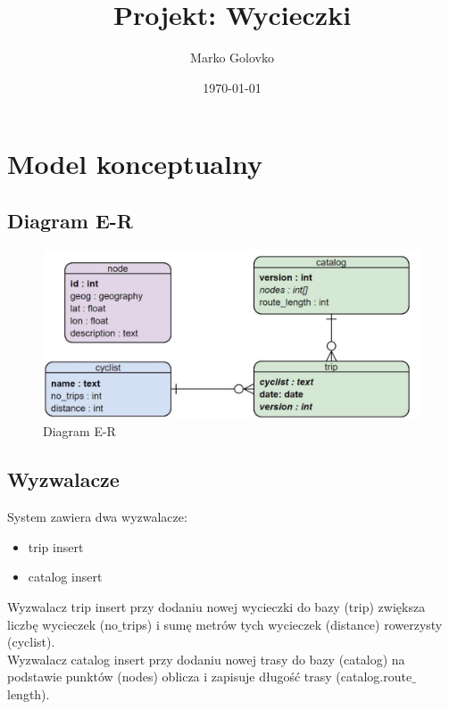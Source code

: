 \documentclass[12pt]{article}
\title{Projekt: Wycieczki}
\author{Marko Golovko}
\date{\today}
\begin{document}
\maketitle

\section*{Model konceptualny}


\subsection*{Diagram E-R}
\begin{figure}[hbt!]
 \centering
 \caption{Diagram E-R}
 \includegraphics[width=1\textwidth]{diagram}
\end{figure}
\subsection*{Wyzwalacze}

System zawiera dwa wyzwalacze:
\begin{itemize}
  \item trip insert 
  \item catalog insert
\end{itemize}
Wyzwalacz trip insert przy dodaniu nowej wycieczki do bazy (trip) zwiększa liczbę wycieczek (no$\_$trips) i sumę metrów tych wycieczek (distance) rowerzysty (cyclist). \\
Wyzwalacz catalog insert przy dodaniu nowej trasy do bazy (catalog) na podstawie punktów (nodes) oblicza i zapisuje długość trasy (catalog.route$\_$length).
\end{document}
